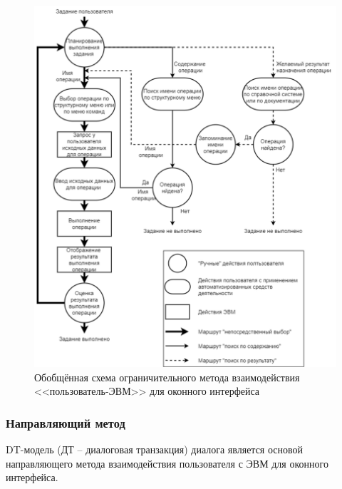 \begin{figure}[!ht]
  \centering
  \includegraphics[scale=0.8]{ResearchNotes/rndhpc_int_gui_2022_10_10/rndhpcgui.2022.10.10.scheme1.png}
  \caption{Обобщённая схема ограничительного метода взаимодействия <<пользователь-ЭВМ>> для оконного интерфейса}
  \label{rndhpcgui.2022.10.10.scheme1}
\end{figure}

\subsubsection{Направляющий метод}
	
DT-модель (ДТ -- диалоговая транзакция) диалога является основой направляющего метода взаимодействия пользователя с ЭВМ для оконного интерфейса. 
	
